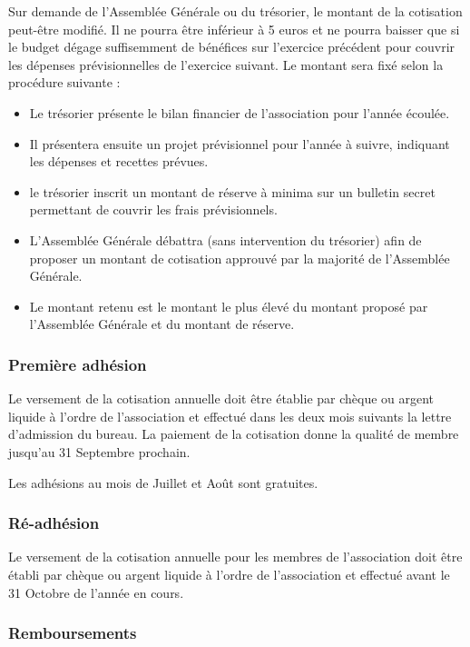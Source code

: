 \documentclass[a4paper,french,10pt]{article}
\begin{document}
Sur demande de l'Assemblée Générale ou du trésorier, le montant de la cotisation peut-être modifié. Il ne pourra être inférieur à 5 euros et ne pourra baisser que si le budget dégage suffisemment de bénéfices sur l'exercice précédent pour couvrir les dépenses prévisionnelles de l'exercice suivant. Le montant sera fixé selon la procédure suivante :
\begin{itemize}
\item Le trésorier présente le bilan financier de l'association pour l'année écoulée.
\item Il présentera ensuite un projet prévisionnel pour l'année à suivre, indiquant les dépenses et recettes prévues.
\item le trésorier inscrit un montant de réserve à minima sur un bulletin secret permettant de couvrir les frais prévisionnels.
\item L'Assemblée Générale débattra (sans intervention du trésorier) afin de proposer un montant de cotisation approuvé par la majorité de l'Assemblée Générale.
\item Le montant retenu est le montant le plus élevé du montant proposé par l'Assemblée Générale et du montant de réserve.
\end{itemize}

\subsubsection{Première adhésion}

Le versement de la cotisation annuelle doit être établie par chèque ou argent liquide à l'ordre de l'association et effectué dans les deux mois suivants la lettre d'admission du bureau. La paiement de la cotisation donne la qualité de membre jusqu'au 31 Septembre prochain.

Les adhésions au mois de Juillet et Août sont gratuites.

\subsubsection{Ré-adhésion}

Le versement de la cotisation annuelle pour les membres de l'association doit être établi par chèque ou argent liquide à l'ordre de l'association et effectué avant le 31 Octobre de l'année en cours.

\subsubsection{Remboursements}
\end{document}
